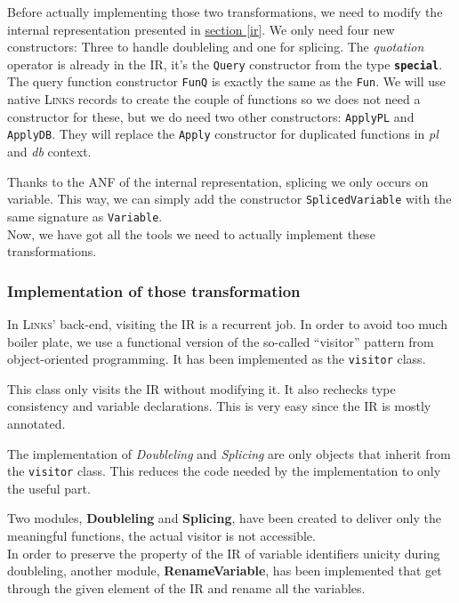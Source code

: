 \documentclass[11pt]{article}
\newcommand\mysc[1]{{\rmfamily\textsc{#1}}\xspace}
\newcommand\links{\mysc{Links}}
\newcommand\refsec[1]{\hyperref[#1]{section \ref*{#1}}}
\newcommand\sig[1]{{\tt\bf #1}}
\newcommand\effect[1]{{\em #1}}
\newcommand\ocamlc[1]{\lstinline[language={[Objective]Caml},basicstyle=\ttfamily\normalsize]{#1}}
\newcommand\module[1]{{\bf #1}}
\begin{document}
Before actually implementing those two transformations, we need to modify the internal representation presented in \refsec{ir}. We only need four new constructors: Three to handle doubleling and one for splicing. The \emph{quotation} operator is already in the IR, it's the \ocamlc{Query} constructor from the type \sig{special}.\\

The query function constructor \ocamlc{FunQ} is exactly the same as the \ocamlc{Fun}. We will use native \links records to create the couple of functions so we does not need a constructor for these, but we do need two other constructors: \ocamlc{ApplyPL} and \ocamlc{ApplyDB}. They will replace the \ocamlc{Apply} constructor for duplicated functions in \effect{pl} and \effect{db} context.

Thanks to the ANF of the internal representation, splicing we only occurs on variable. This way, we can simply add the constructor \ocamlc{SplicedVariable} with the same signature as \ocamlc{Variable}.\\

Now, we have got all the tools we need to actually implement these transformations.

\subsubsection{Implementation of those transformation}

In \links' back-end, visiting the IR is a recurrent job. In order to avoid too much boiler plate, we use a functional version of the so-called ``visitor'' pattern from object-oriented programming. It has been implemented as the \ocamlc{visitor} class.

This class only visits the IR without modifying it. It also rechecks type consistency and variable declarations. This is very easy since the IR is mostly annotated.

The implementation of \emph{Doubleling} and \emph{Splicing} are only objects that inherit from the \ocamlc{visitor} class. This reduces the code needed by the implementation to only the useful part.

Two modules, \module{Doubleling} and \module{Splicing}, have been created to deliver only the meaningful functions, the actual visitor is not accessible.\\
In order to preserve the property of the IR of variable identifiers unicity during doubleling, another module, \module{RenameVariable}, has been implemented that get through the given element of the IR and rename all the variables.
\end{document}
